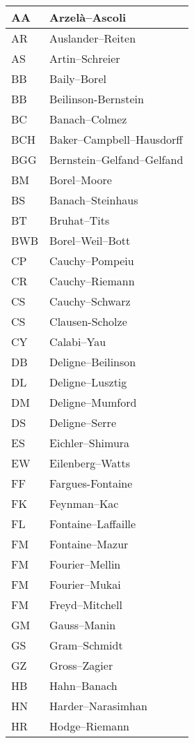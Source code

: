 \documentclass{amsart}
\numberwithin{equation}{section}
\theoremstyle{plain}
\numberwithin{equation}{section}
\theoremstyle{remark}
\begin{document}
\begin{longtable}{l|l}
\hline
AA & Arzelà--Ascoli\\ \hline
AR & Auslander--Reiten  \\ \hline
AS & Artin--Schreier\\ \hline
BB & Baily--Borel\\ \hline
BB & Beilinson-Bernstein\\ \hline
BC & Banach--Colmez\\ \hline
BCH & Baker--Campbell--Hausdorff\\ \hline
BGG  & Bernstein--Gelfand--Gelfand\\ \hline
BM & Borel–Moore\\ \hline
BS & Banach--Steinhaus\\ \hline
BT & Bruhat--Tits\\ \hline
BWB & Borel--Weil--Bott\\ \hline
CP &  Cauchy--Pompeiu\\ \hline
CR & Cauchy--Riemann\\ \hline
CS & Cauchy--Schwarz\\ \hline
CS & Clausen-Scholze\\ \hline
CY & Calabi--Yau\\ \hline
DB & Deligne--Beilinson\\ \hline
DL & Deligne--Lusztig\\ \hline
DM & Deligne--Mumford\\ \hline
DS & Deligne--Serre \\ \hline
ES & Eichler--Shimura\\ \hline
EW & Eilenberg--Watts\\ \hline
FF & Fargues-Fontaine\\ \hline
FK & Feynman--Kac\\ \hline
FL & Fontaine--Laffaille\\ \hline
FM & Fontaine--Mazur\\ \hline
FM & Fourier--Mellin\\ \hline
FM & Fourier--Mukai\\ \hline
FM & Freyd--Mitchell\\ \hline
GM & Gauss--Manin\\ \hline
GS & Gram--Schmidt\\ \hline
GZ & Gross--Zagier\\ \hline
HB & Hahn--Banach\\ \hline
HN & Harder--Narasimhan\\ \hline
HR & Hodge--Riemann\\ \hline

\end{longtable}
\end{document}
